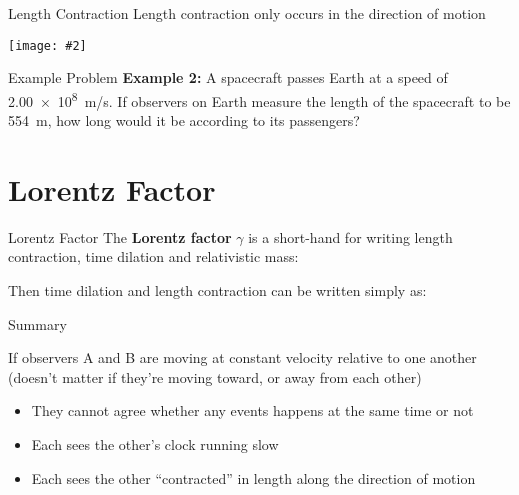 \documentclass[12pt,compress,aspectratio=169]{beamer}
\newcommand{\pic}[2]{\texttt{[image: \#2]}}
\newcommand{\bigsqrt}{\ensuremath\sqrt{1-\left(\frac{v}{c}\right)^2}}
\newcommand{\lorentz}{\ensuremath\frac{1}{\bigsqrt}}
\newcommand{\eq}[2]{\vspace{#1}{\Large\begin{displaymath}#2\end{displaymath}}}
\begin{document}
\begin{frame}{Length Contraction}
  Length contraction only occurs in the direction of motion
  \begin{center}
    \pic{.8}{graphics/baseball-contraction.jpg}
    \end{center}
\end{frame}

\begin{frame}{Example Problem}
  \textbf{Example 2:} A spacecraft passes Earth at a speed of \SI{2.00e8}{m/s}.
  If observers on Earth measure the length of the spacecraft to be
  \SI{554}{\metre}, how long would it be according to its passengers?
\end{frame}


\section{Lorentz Factor}

\begin{frame}{Lorentz Factor}
  The \textbf{Lorentz factor} $\gamma$ is a short-hand for writing length
  contraction, time dilation and relativistic mass:

  \eq{-.2in}{
    \boxed{\gamma=\lorentz}
  }
  
  Then time dilation and length contraction can be written simply as:
  
  \eq{-.1in}{
    \boxed{t' = \gamma t}\quad\boxed{L' = \frac{L}{\gamma}}
  }
\end{frame}


\begin{frame}{Summary}
  \begin{center}
  \end{center}
  If observers A and B are moving at constant velocity relative to one another
  (doesn't matter if they're moving toward, or away from each other)
  \begin{itemize}
  \item They cannot agree whether any events happens at the same time or not
  \item Each sees the other's clock running slow
  \item Each sees the other ``contracted'' in length along the direction of
    motion
  \end{itemize}
\end{frame}
\end{document}

